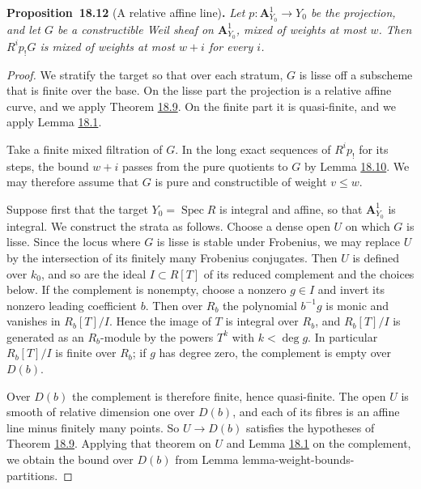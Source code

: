 \documentclass[11pt]{article}
\newenvironment{bpstatement}[2]{\par\addvspace{0.6\baselineskip}\noindent\textbf{#1}#2\textbf{.}\enspace\ignorespaces}
  {\par\addvspace{0.4\baselineskip}}
\newenvironment{bpstatementit}[2]{\begin{bpstatement}{#1}{#2}\itshape\ignorespaces}{\end{bpstatement}}
\begin{document}
\label{bp38}%
\begin{bpstatementit}{Proposition~18.12}{ (A relative affine line)}
Let \(p:\mathbf A^1_{Y_0}\to Y_0\) be the projection, and let \(G\) be a constructible Weil sheaf on \(\mathbf A^1_{Y_0}\), mixed of weights at most \(w\). Then \(R^ip_!G\) is mixed of weights at most \(w+i\) for every \(i\).
\end{bpstatementit}

\begin{proof}[{Proof}]\label{bp39}%
We stratify the target so that over each stratum, \(G\) is lisse off a subscheme that is finite over the base. On the lisse part the projection is a relative affine curve, and we apply Theorem \hyperref[bp29]{18.9}. On the finite part it is quasi-finite, and we apply Lemma \hyperref[bp5]{18.1}.

Take a finite mixed filtration of \(G\). In the long exact sequences of \(R^ip_!\) for its steps, the bound \(w+i\) passes from the pure quotients to \(G\) by Lemma \hyperref[bp33]{18.10}. We may therefore assume that \(G\) is pure and constructible of weight \(v\leq w\).

Suppose first that the target \(Y_0=\operatorname{Spec}R\) is integral and affine, so that \(\mathbf A^1_{Y_0}\) is integral. We construct the strata as follows. Choose a dense open \(U\) on which \(G\) is lisse. Since the locus where \(G\) is lisse is stable under Frobenius, we may replace \(U\) by the intersection of its finitely many Frobenius conjugates. Then \(U\) is defined over \(k_0\), and so are the ideal \(I\subset R[T]\) of its reduced complement and the choices below. If the complement is nonempty, choose a nonzero \(g\in I\) and invert its nonzero leading coefficient \(b\). Then over \(R_b\) the polynomial \(b^{-1}g\) is monic and vanishes in \(R_b[T]/I\). Hence the image of \(T\) is integral over \(R_b\), and \(R_b[T]/I\) is generated as an \(R_b\)-module by the powers \(T^k\) with \(k<\deg g\). In particular \(R_b[T]/I\) is finite over \(R_b\); if \(g\) has degree zero, the complement is empty over \(D(b)\).

Over \(D(b)\) the complement is therefore finite, hence quasi-finite. The open \(U\) is smooth of relative dimension one over \(D(b)\), and each of its fibres is an affine line minus finitely many points. So \(U\to D(b)\) satisfies the hypotheses of Theorem \hyperref[bp29]{18.9}. Applying that theorem on \(U\) and Lemma \hyperref[bp5]{18.1} on the complement, we obtain the bound over \(D(b)\) from Lemma lemma-weight-bounds-partitions.


\end{proof}
\end{document}
